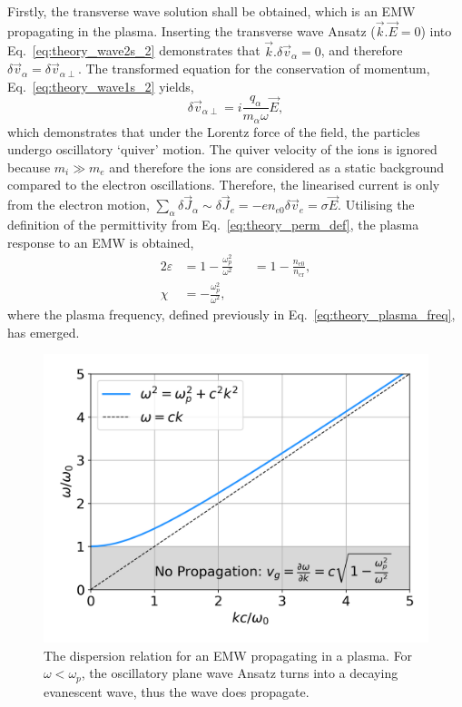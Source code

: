 Firstly, the transverse wave solution shall be obtained, which is an \ac{EMW} propagating in the plasma.
Inserting the transverse wave Ansatz ($\vec{k}.\vec{E}=0$) into Eq.~\ref{eq:theory_wave2s_2} demonstrates that $\vec{k}.\delta\vec{v}_\alpha=0$, and therefore $\delta\vec{v}_\alpha = \delta\vec{v}_{\alpha\perp}$.
The transformed equation for the conservation of momentum, Eq.~\ref{eq:theory_wave1s_2} yields,
\begin{equation}
    \label{eq:theory_EMW_quiver}
    \delta\vec{v}_{\alpha\perp} = i \frac{q_\alpha}{m_\alpha \omega}\vec{E},
\end{equation}
which demonstrates that under the Lorentz force of the field, the particles undergo oscillatory `quiver' motion.
The quiver velocity of the ions is ignored because $m_i \gg m_e$ and therefore the ions are considered as a static background compared to the electron oscillations.
Therefore, the linearised current is only from the electron motion, $\sum\nolimits_\alpha\delta\vec{J}_\alpha\sim\delta\vec{J}_e = -e n_{e0}\delta \vec{v}_e = \sigma \vec{E}$.
Utilising the definition of the permittivity from Eq.~\ref{eq:theory_perm_def}, the plasma response to an \ac{EMW} is obtained,
\begin{alignat}{2}
    \label{eq:theory_emw_epsilon}
    \varepsilon &= 1 - \frac{\omega_p^2}{\omega^2} &&= 1- \frac{n_{e0}}{n_{\text{cr}}},\\
    \chi &= - \frac{\omega_p^2}{\omega^2}, &&
\end{alignat}
where the plasma frequency, defined previously in Eq.~\ref{eq:theory_plasma_freq}, has emerged.

\begin{figure}[t!]
    \includegraphics[width=0.6\linewidth]{Theory/Images/EMW_disp_rel.png}
    \centering
    \caption{The dispersion relation for an \ac{EMW} propagating in a plasma.
    For $\omega<\omega_p$, the oscillatory plane wave Ansatz turns into a decaying evanescent wave, thus the wave does propagate.}%
    \label{fig:EMW_disp_rel}
\end{figure}

